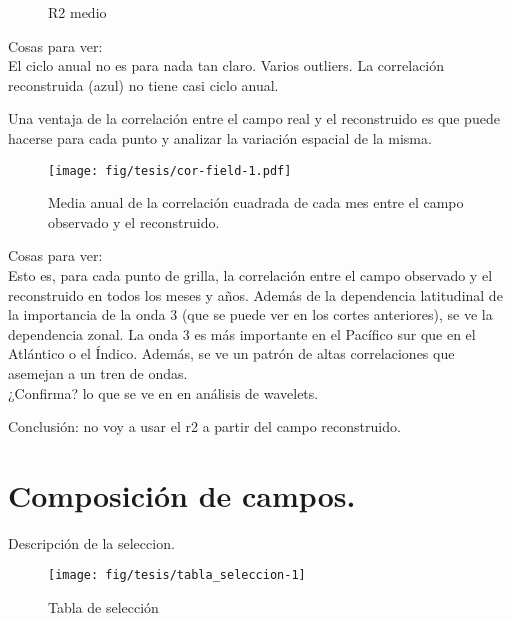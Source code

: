 \documentclass[spanish,a4paper]{book}
\begin{document}
\begin{figure*}
\newline{}\caption{R2 medio}\label{fig:r2_timeseries}
\end{figure*}

Cosas para ver:\\
El ciclo anual no es para nada tan claro. Varios outliers. La
correlación reconstruida (azul) no tiene casi ciclo anual.

Una ventaja de la correlación entre el campo real y el reconstruido es
que puede hacerse para cada punto y analizar la variación espacial de la
misma.

\begin{figure}
\centering
\texttt{[image: fig/tesis/cor-field-1.pdf]}
\caption{Media anual de la correlación cuadrada de cada mes entre el
campo observado y el reconstruido.}
\end{figure}

Cosas para ver:\\
Esto es, para cada punto de grilla, la correlación entre el campo
observado y el reconstruido en todos los meses y años. Además de la
dependencia latitudinal de la importancia de la onda 3 (que se puede ver
en los cortes anteriores), se ve la dependencia zonal. La onda 3 es más
importante en el Pacífico sur que en el Atlántico o el Índico. Además,
se ve un patrón de altas correlaciones que asemejan a un tren de
ondas.\\
¿Confirma? lo que se ve en en análisis de wavelets.

Conclusión: no voy a usar el r2 a partir del campo reconstruido.

\section{Composición de campos.}\label{composicion-de-campos.}

Descripción de la seleccion.

\begin{figure}

{\centering \texttt{[image: fig/tesis/tabla\_seleccion-1]} 

}

\caption{Tabla de selección}\label{fig:tabla_seleccion}
\end{figure}
\end{document}
